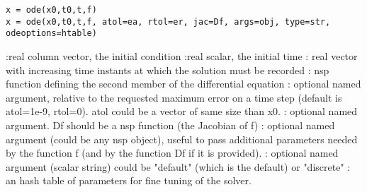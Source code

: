 
\begin{mandesc}
\end{mandesc}

\begin{calling_sequence}
\begin{verbatim}
x = ode(x0,t0,t,f)
x = ode(x0,t0,t,f, atol=ea, rtol=er, jac=Df, args=obj, type=str, odeoptions=htable)
\end{verbatim}
\end{calling_sequence}
\begin{parameters}
  \begin{varlist}
    :real column vector, the initial condition
    :real scalar, the initial time
    : real vector with increasing time instants at which the solution must be recorded
    : nsp function defining the second member of the differential equation
    : optional named argument, relative to the requested maximum error on a time step 
                     (default is atol=1e-9, rtol=0). atol could be a vector of same size than x0.
    : optional named argument. Df should be a nsp function (the Jacobian of f)
    : optional named argument (could be any nsp object), useful to pass additional parameters needed by
    the function f (and by the function Df if it is provided).
    : optional named argument (scalar string) could be "default" (which is the default) or "discrete"
    : an hash table of parameters for fine tuning of the solver.
  \end{varlist}
\end{parameters}

